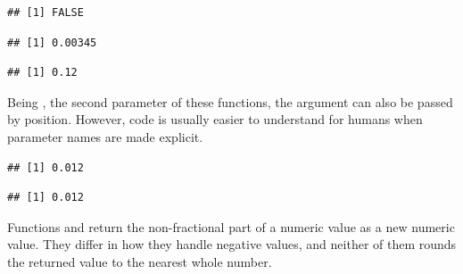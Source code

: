 \documentclass[krantz2]{krantz}\usepackage{knitr}
\begin{document}
\begin{knitrout}
\begin{kframe}
\begin{alltt}
 \hlopt{==} 
\end{alltt}
\begin{verbatim}
## [1] FALSE
\end{verbatim}
\begin{alltt}
 \hlopt{-} 
\end{alltt}
\begin{verbatim}
## [1] 0.00345
\end{verbatim}
\begin{alltt}
\end{alltt}
\begin{verbatim}
## [1] 0.12
\end{verbatim}
\end{kframe}
\end{knitrout}

\begin{explainbox}
Being , the second parameter of these functions, the argument can also be passed by position. However, code is usually easier to understand for humans when parameter names are made explicit.

\begin{knitrout}\footnotesize
{}\color{fgcolor}\begin{kframe}
\begin{alltt}
\hlstd{(}\hlstd{,}  \hlstd{=} \hlstd{)}
\end{alltt}
\begin{verbatim}
## [1] 0.012
\end{verbatim}
\begin{alltt}
\hlstd{(}\hlstd{,} \hlstd{)}
\end{alltt}
\begin{verbatim}
## [1] 0.012
\end{verbatim}
\end{kframe}
\end{knitrout}
\end{explainbox}

Functions  and  return the non-fractional part of a numeric value as a new numeric value. They differ in how they handle negative values, and neither of them rounds the returned value to the nearest whole number.
\end{document}
